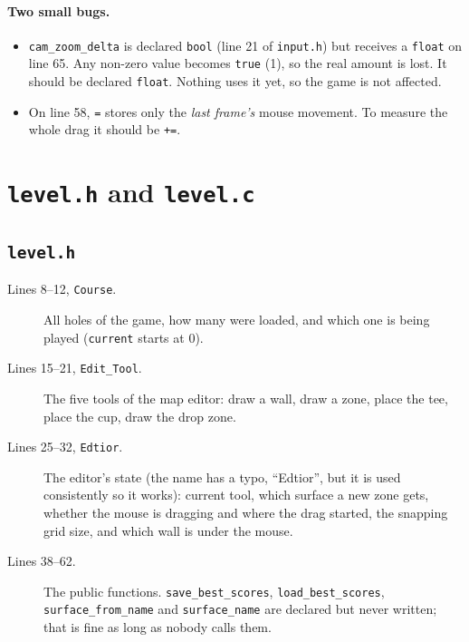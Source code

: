 \documentclass[11pt,a4paper]{article}
\newcommand{\code}[3]{}
\begin{document}
\paragraph{Two small bugs.}
\begin{itemize}
  \item \texttt{cam\_zoom\_delta} is declared \texttt{bool} (line 21 of \texttt{input.h}) but receives a
  \texttt{float} on line 65. Any non-zero value becomes \texttt{true} (1), so the real amount is lost. It should be
  declared \texttt{float}. Nothing uses it yet, so the game is not affected.
  \item On line 58, \texttt{=} stores only the \emph{last frame's} mouse movement. To measure the whole drag it
  should be \texttt{+=}.
\end{itemize}

\section{\texttt{level.h} and \texttt{level.c}}\label{sec:level}

\subsection{\texttt{level.h}}

\code{level.h}{1}{67}

\begin{description}
  \item[Lines 8--12, \texttt{Course}.] All holes of the game, how many were loaded, and which one is being played
  (\texttt{current} starts at 0).
  \item[Lines 15--21, \texttt{Edit\_Tool}.] The five tools of the map editor: draw a wall, draw a zone, place the tee,
  place the cup, draw the drop zone.
  \item[Lines 25--32, \texttt{Edtior}.] The editor's state (the name has a typo, ``Edtior'', but it is used
  consistently so it works): current tool, which surface a new zone gets, whether the mouse is dragging and where
  the drag started, the snapping grid size, and which wall is under the mouse.
  \item[Lines 38--62.] The public functions. \texttt{save\_best\_scores}, \texttt{load\_best\_scores},
  \texttt{surface\_from\_name} and \texttt{surface\_name} are declared but never written; that is fine as long as
  nobody calls them.
\end{description}
\end{document}

